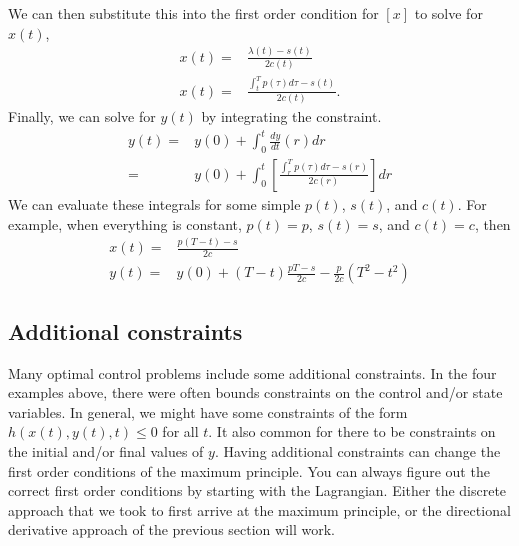 \begin{example}
  We can then substitute this into the first order condition for $[x]$
  to solve for $x(t)$,
  \begin{align*}
    x(t) = & \frac{\lambda(t) - s(t)}{2c(t)} \\
    x(t) = & \frac{\int_{t}^T p(\tau)d\tau - s(t)}{2c(t)}.
  \end{align*}
  Finally, we can solve for $y(t)$ by integrating the constraint.
  \begin{align*}
    y(t) = & y(0) + \int_0^t \frac{dy}{dt}(r) dr \\
    = & y(0) + \int_0^t \left[ \frac{\int_{r}^T p(\tau)d\tau - s(r)}{2c(r)} \right] dr 
  \end{align*}
  We can evaluate these integrals for some simple $p(t)$, $s(t)$, and $c(t)$.
  For example, when everything is constant, $p(t) = p$, $s(t)=s$, and
  $c(t)=c$, then 
  \begin{align*}
    x(t) = & \frac{p(T-t) - s}{2c} \\
    y(t) = & y(0) + (T-t)\frac{pT-s}{2c} - \frac{p}{2c}(T^2-t^2)
  \end{align*}
\end{example}

\subsection{Additional constraints \label{sec:constraints}}

Many optimal control problems include some additional constraints. In
the four examples above, there were often bounds constraints on the
control and/or state variables. In general, we might have some
constraints of the form $h(x(t),y(t), t) \leq 0$ for all $t$. It also
common for there to be constraints on the initial and/or final values
of $y$. Having additional constraints can change the first order
conditions of the maximum principle. You can always figure out the
correct first order conditions by starting with the Lagrangian. Either
the discrete approach that we took to first arrive at the maximum
principle, or the directional derivative approach of the previous
section will work. 

